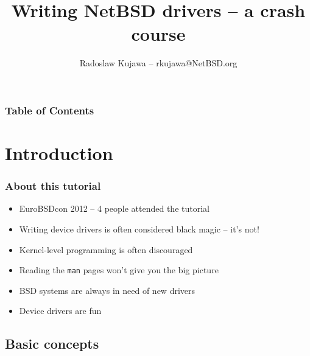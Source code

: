 \documentclass[dvipsnames,table]{beamer}
\title{Writing NetBSD drivers -- a crash course}
\author{Radoslaw Kujawa -- rkujawa@NetBSD.org}
\institute{The NetBSD Foundation}
\begin{document}
\begin{frame}
\titlepage
\end{frame}

\begin{frame}[allowframebreaks]
\frametitle{Table of Contents}
{
\hypersetup{colorlinks=true,linkcolor=black,urlcolor=NetBSD-orange}
\tableofcontents
}
\end{frame}

\section{Introduction}

\begin{frame}
\frametitle{About this tutorial}
\begin{itemize}
	\item EuroBSDcon 2012 -- 4 people attended the tutorial
	\item Writing device drivers is often considered black magic -- it's not!
	\item Kernel-level programming is often discouraged
	\item Reading the {\tt man} pages won't give you the big picture
	\item BSD systems are always in need of new drivers
	\item Device drivers are fun {\Large \smiley}
\end{itemize}
\end{frame}


\subsection{Basic concepts}
\end{document}
